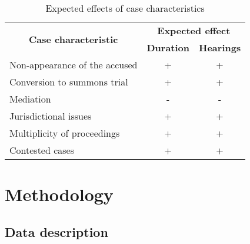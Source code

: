 \documentclass[12pt,a4paper]{article}
\begin{document}
		\begin{table}[!ht]
			\caption{Expected effects of case characteristics}
			\label{tab:expected}
			\centering
			\footnotesize
		\begin{tabular}{@{}lcc@{}}
			\toprule
			\multicolumn{1}{c}{\multirow{2}{*}{\textbf{Case characteristic}}} & \multicolumn{2}{c}{\textbf{Expected effect}} \\ \cmidrule(l){2-3} 
			\multicolumn{1}{c}{} & \textbf{Duration} & \textbf{Hearings} \\ \midrule
			Non-appearance of the accused & + & + \\
			Conversion to summons trial & + & + \\
			Mediation & - & - \\
			Jurisdictional issues & + & + \\
			Multiplicity of proceedings & + & + \\
			Contested cases & + & + \\ \bottomrule
		\end{tabular}
	\end{table}
		
		\section{Methodology}
		\label{sec:methodology}
		
		\subsection{Data description} \label{sec:data-description}
		
\end{document}
